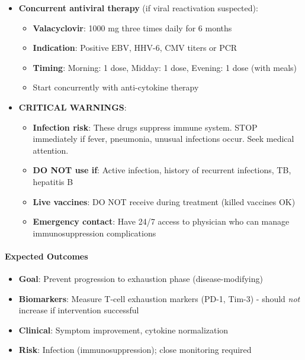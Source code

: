 \begin{itemize}
    \item \textbf{Concurrent antiviral therapy} (if viral reactivation suspected):
    \begin{itemize}
        \item \textbf{Valacyclovir}: 1000 mg three times daily for 6 months
        \item \textbf{Indication}: Positive EBV, HHV-6, CMV titers or PCR
        \item \textbf{Timing}: Morning: 1 dose, Midday: 1 dose, Evening: 1 dose (with meals)
        \item Start concurrently with anti-cytokine therapy
    \end{itemize}

    \item \textbf{CRITICAL WARNINGS}:
    \begin{itemize}
        \item \textbf{Infection risk}: These drugs suppress immune system. STOP immediately if fever, pneumonia, unusual infections occur. Seek medical attention.
        \item \textbf{DO NOT use if}: Active infection, history of recurrent infections, TB, hepatitis B
        \item \textbf{Live vaccines}: DO NOT receive during treatment (killed vaccines OK)
        \item \textbf{Emergency contact}: Have 24/7 access to physician who can manage immunosuppression complications
    \end{itemize}
\end{itemize}

\paragraph{Expected Outcomes}
\begin{itemize}
    \item \textbf{Goal}: Prevent progression to exhaustion phase (disease-modifying)
    \item \textbf{Biomarkers}: Measure T-cell exhaustion markers (PD-1, Tim-3) - should \emph{not} increase if intervention successful
    \item \textbf{Clinical}: Symptom improvement, cytokine normalization
    \item \textbf{Risk}: Infection (immunosuppression); close monitoring required
\end{itemize}


